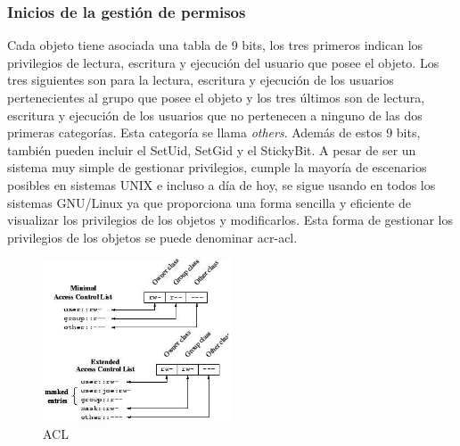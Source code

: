 \documentclass[twoside, titlepage, 12pt, a4paper]{article}
\begin{document}
\subsubsection{Inicios de la gestión de permisos}
Cada objeto tiene asociada una tabla de 9 bits, los tres primeros indican los privilegios de lectura, escritura y ejecución del usuario que posee el objeto. Los tres siguientes son para la lectura, escritura y ejecución de los usuarios pertenecientes al grupo que posee el objeto y los tres últimos son de lectura, escritura y ejecución de los usuarios que no pertenecen a ninguno de las dos primeras categorías. Esta categoría se llama \textit{others}. Además de estos 9 bits, también pueden incluir el \gls{SetUid}, \gls{SetGid} y el \gls{StickyBit}. A pesar de ser un sistema muy simple de gestionar privilegios, cumple la mayoría de escenarios posibles en sistemas UNIX e incluso a día de hoy, se sigue usando en todos los sistemas \gls{GNU/Linux} ya que proporciona una forma sencilla y eficiente de visualizar los privilegios de los objetos y modificarlos. Esta forma de gestionar los privilegios de los objetos se puede denominar \gls{acr-acl}.
\begin{figure}[H]
    \centering
    \includegraphics[width=0.5\textwidth]{Media/ACL.jpg}
    \caption{\gls{ACL}}
    \label{fig:ACL}
\end{figure}
\end{document}
